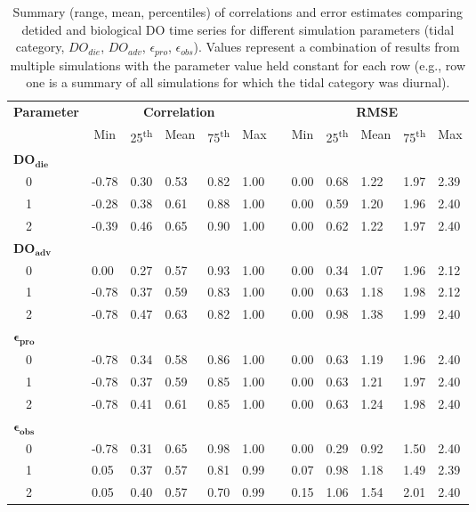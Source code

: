 \documentclass[letterpaper,12pt,oneside]{article}\usepackage[]{graphicx}\usepackage[]{color}
\begin{document}
%
\begin{table}[h]
\caption{Summary (range, mean, percentiles) of correlations and error estimates comparing detided and biological \ac{DO} time series for different simulation parameters (tidal category, $DO_{die}$, $DO_{adv}$, $\epsilon_{pro}$, $\epsilon_{obs}$).  Values represent a combination of results from multiple simulations with the parameter value held constant for each row (e.g., row one is a summary of all simulations for which the tidal category was diurnal).\label{tab:dtd_perf1}} 
\begin{center}
\begin{tabular}{llllllclllll}
\hline\hline
\multicolumn{1}{l}{\bfseries Parameter}&\multicolumn{5}{c}{\bfseries Correlation}&\multicolumn{1}{c}{\bfseries }&\multicolumn{5}{c}{\bfseries RMSE}\tabularnewline
\cline{2-6} \cline{8-12}
\multicolumn{1}{l}{}&\multicolumn{1}{c}{Min}&\multicolumn{1}{c}{25\textsuperscript{th}}&\multicolumn{1}{c}{Mean}&\multicolumn{1}{c}{75\textsuperscript{th}}&\multicolumn{1}{c}{Max}&\multicolumn{1}{c}{}&\multicolumn{1}{c}{Min}&\multicolumn{1}{c}{25\textsuperscript{th}}&\multicolumn{1}{c}{Mean}&\multicolumn{1}{c}{75\textsuperscript{th}}&\multicolumn{1}{c}{Max}\tabularnewline
\hline
{\bfseries $\boldsymbol{DO_{die}}$}&&&&&&&&&&&\tabularnewline
~~0&-0.78&0.30&0.53&0.82&1.00&&0.00&0.68&1.22&1.97&2.39\tabularnewline
~~1&-0.28&0.38&0.61&0.88&1.00&&0.00&0.59&1.20&1.96&2.40\tabularnewline
~~2&-0.39&0.46&0.65&0.90&1.00&&0.00&0.62&1.22&1.97&2.40\tabularnewline
\hline
{\bfseries $\boldsymbol{DO_{adv}}$}&&&&&&&&&&&\tabularnewline
~~0& 0.00&0.27&0.57&0.93&1.00&&0.00&0.34&1.07&1.96&2.12\tabularnewline
~~1&-0.78&0.37&0.59&0.83&1.00&&0.00&0.63&1.18&1.98&2.12\tabularnewline
~~2&-0.78&0.47&0.63&0.82&1.00&&0.00&0.98&1.38&1.99&2.40\tabularnewline
\hline
{\bfseries $\boldsymbol{\epsilon_{pro}}$}&&&&&&&&&&&\tabularnewline
~~0&-0.78&0.34&0.58&0.86&1.00&&0.00&0.63&1.19&1.96&2.40\tabularnewline
~~1&-0.78&0.37&0.59&0.85&1.00&&0.00&0.63&1.21&1.97&2.40\tabularnewline
~~2&-0.78&0.41&0.61&0.85&1.00&&0.00&0.63&1.24&1.98&2.40\tabularnewline
\hline
{\bfseries $\boldsymbol{\epsilon_{obs}}$}&&&&&&&&&&&\tabularnewline
~~0&-0.78&0.31&0.65&0.98&1.00&&0.00&0.29&0.92&1.50&2.40\tabularnewline
~~1& 0.05&0.37&0.57&0.81&0.99&&0.07&0.98&1.18&1.49&2.39\tabularnewline
~~2& 0.05&0.40&0.57&0.70&0.99&&0.15&1.06&1.54&2.01&2.40\tabularnewline
\hline
\end{tabular}
\end{center}
\end{table}
\end{document}
